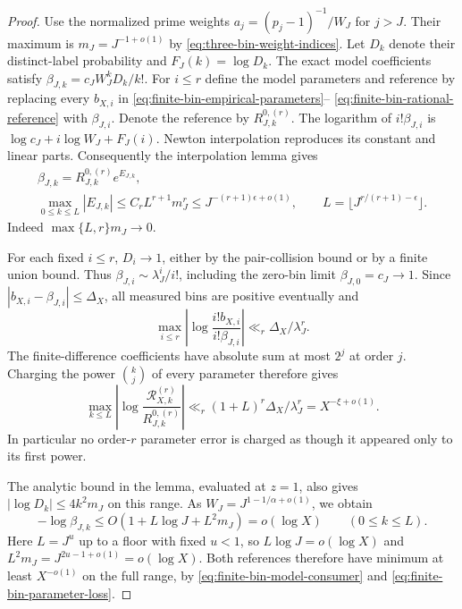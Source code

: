 \documentclass[11pt]{article}
\theoremstyle{definition}
\begin{document}
\begin{proof}
Use the normalized prime weights
$a_j=(p_j-1)^{-1}/W_J$ for $j>J$.
Their maximum is $m_J=J^{-1+o(1)}$ by
\eqref{eq:three-bin-weight-indices}.
Let $D_k$ denote their distinct-label probability and
$F_J(k)=\log D_k$.
The exact model coefficients satisfy
$\beta_{J,k}=c_JW_J^kD_k/k!$.
For $i\le r$ define the model parameters and reference
by replacing every $b_{X,i}$ in
\eqref{eq:finite-bin-empirical-parameters}--%
\eqref{eq:finite-bin-rational-reference} with $\beta_{J,i}$.
Denote the reference by $R^{0,(r)}_{J,k}$.
The logarithm of $i!\beta_{J,i}$ is
$\log c_J+i\log W_J+F_J(i)$.
Newton interpolation reproduces its constant and linear parts.
Consequently the interpolation lemma gives
\begin{equation}
 \begin{gathered}
 \beta_{J,k}=R^{0,(r)}_{J,k}e^{E_{J,k}},\\
 \max_{0\le k\le L}|E_{J,k}|
       \le C_r L^{r+1}m_J^r
       \le J^{-(r+1)\epsilon+o(1)},\qquad
 L=\lfloor J^{r/(r+1)-\epsilon}\rfloor .
 \end{gathered}
 \label{eq:finite-bin-model-consumer}
\end{equation}
Indeed $\max\{L,r\}m_J\to0$.

For each fixed $i\le r$, $D_i\to1$, either by the
pair-collision bound or by a finite union bound.
Thus $\beta_{J,i}\sim\lambda_J^i/i!$, including the
zero-bin limit $\beta_{J,0}=c_J\to1$.
Since $|b_{X,i}-\beta_{J,i}|\le\Delta_X$, all measured
bins are positive eventually and
\[
 \max_{i\le r}
 \left|\log\frac{i!b_{X,i}}{i!\beta_{J,i}}\right|
       \ll_r \Delta_X/\lambda_J^r .
\]
The finite-difference coefficients have absolute sum at most
$2^j$ at order $j$.
Charging the power $\binom kj$ of every parameter therefore gives
\begin{equation}
 \max_{k\le L}
   \left|\log\frac{\mathcal R^{(r)}_{X,k}}{R^{0,(r)}_{J,k}}\right|
       \ll_r(1+L)^r\Delta_X/\lambda_J^r
       =X^{-\xi+o(1)} .
 \label{eq:finite-bin-parameter-loss}
\end{equation}
In particular no order-$r$ parameter error is charged as
though it appeared only to its first power.

The analytic bound in the lemma, evaluated at $z=1$,
also gives $|\log D_k|\le4k^2m_J$ on this range.
As $W_J=J^{1-1/\alpha+o(1)}$, we obtain
\[
 -\log\beta_{J,k}
       \le O(1+L\log J+L^2m_J)=o(\log X)
                                  \qquad(0\le k\le L).
\]
Here $L=J^u$ up to a floor with fixed $u<1$,
so $L\log J=o(\log X)$ and
$L^2m_J=J^{2u-1+o(1)}=o(\log X)$.
Both references therefore have minimum at least $X^{-o(1)}$
on the full range, by
\eqref{eq:finite-bin-model-consumer} and
\eqref{eq:finite-bin-parameter-loss}.


\end{proof}
\end{document}
